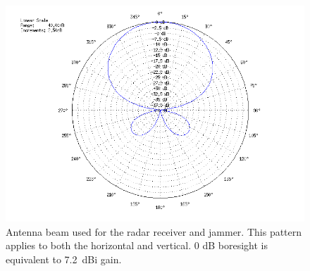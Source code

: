 \documentclass[conference]{IEEEtran}
\begin{document}
\begin{figure}[htbp]
\begin{center}
\includegraphics[width=0.9\columnwidth]{figs/Simulations/AntennaBeam.png}
\caption[Antenna pattern used in jamming simulations.]{Antenna beam used for the radar receiver and jammer. This pattern applies to both the horizontal and vertical. 0 dB boresight is equivalent to 7.2~dBi gain.}
\label{fig:AntennaBeam}
\end{center}
\end{figure}
\end{document}
